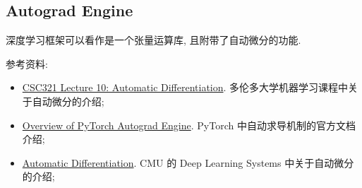 \subsection{Autograd Engine}
深度学习框架可以看作是一个张量运算库, 且附带了自动微分的功能. 

参考资料:
\begin{itemize}
	\item \href{https://www.cs.toronto.edu/~rgrosse/courses/csc321_2018/slides/lec10.pdf}{CSC321 Lecture 10: Automatic Differentiation}. 多伦多大学机器学习课程中关于自动微分的介绍;
	
	\item \href{https://pytorch.org/blog/overview-of-pytorch-autograd-engine/}{Overview of PyTorch Autograd Engine}. PyTorch 中自动求导机制的官方文档介绍;
	
	\item \href{https://dlsyscourse.org/slides/4-automatic-differentiation.pdf}{Automatic Differentiation}. CMU 的 Deep Learning Systems 中关于自动微分的介绍;
\end{itemize}